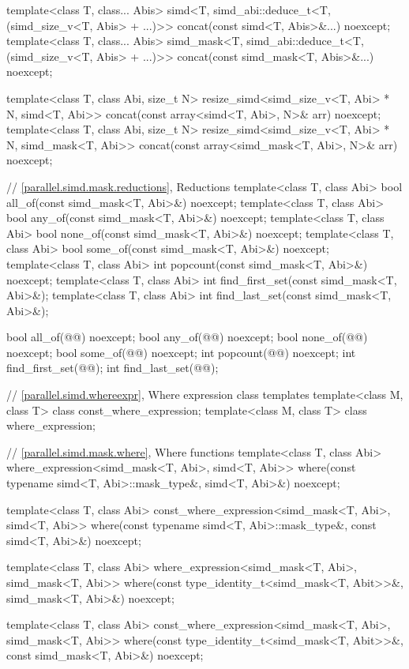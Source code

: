 \begin{codeblock}
{{  template<class T, class... Abis>
    simd<T, simd_abi::deduce_t<T, (simd_size_v<T, Abis> + ...)>>
      concat(const simd<T, Abis>&...) noexcept;
  template<class T, class... Abis>
    simd_mask<T, simd_abi::deduce_t<T, (simd_size_v<T, Abis> + ...)>>
      concat(const simd_mask<T, Abis>&...) noexcept;

  template<class T, class Abi, size_t N>
    resize_simd<simd_size_v<T, Abi> * N, simd<T, Abi>>
      concat(const array<simd<T, Abi>, N>& arr) noexcept;
  template<class T, class Abi, size_t N>
    resize_simd<simd_size_v<T, Abi> * N, simd_mask<T, Abi>>
      concat(const array<simd_mask<T, Abi>, N>& arr) noexcept;

  // \ref{parallel.simd.mask.reductions}, Reductions
  template<class T, class Abi> bool all_of(const simd_mask<T, Abi>&) noexcept;
  template<class T, class Abi> bool any_of(const simd_mask<T, Abi>&) noexcept;
  template<class T, class Abi> bool none_of(const simd_mask<T, Abi>&) noexcept;
  template<class T, class Abi> bool some_of(const simd_mask<T, Abi>&) noexcept;
  template<class T, class Abi> int popcount(const simd_mask<T, Abi>&) noexcept;
  template<class T, class Abi> int find_first_set(const simd_mask<T, Abi>&);
  template<class T, class Abi> int find_last_set(const simd_mask<T, Abi>&);

  bool all_of(@@) noexcept;
  bool any_of(@@) noexcept;
  bool none_of(@@) noexcept;
  bool some_of(@@) noexcept;
  int popcount(@@) noexcept;
  int find_first_set(@@);
  int find_last_set(@@);

  // \ref{parallel.simd.whereexpr}, Where expression class templates
  template<class M, class T> class const_where_expression;
  template<class M, class T> class where_expression;

  // \ref{parallel.simd.mask.where}, Where functions
  template<class T, class Abi>
    where_expression<simd_mask<T, Abi>, simd<T, Abi>>
      where(const typename simd<T, Abi>::mask_type&, simd<T, Abi>&) noexcept;

  template<class T, class Abi>
    const_where_expression<simd_mask<T, Abi>, simd<T, Abi>>
      where(const typename simd<T, Abi>::mask_type&, const simd<T, Abi>&) noexcept;

  template<class T, class Abi>
    where_expression<simd_mask<T, Abi>, simd_mask<T, Abi>>
      where(const type_identity_t<simd_mask<T, Abit>>&, simd_mask<T, Abi>&) noexcept;

  template<class T, class Abi>
    const_where_expression<simd_mask<T, Abi>, simd_mask<T, Abi>>
      where(const type_identity_t<simd_mask<T, Abit>>&, const simd_mask<T, Abi>&) noexcept;

}}
\end{codeblock}
